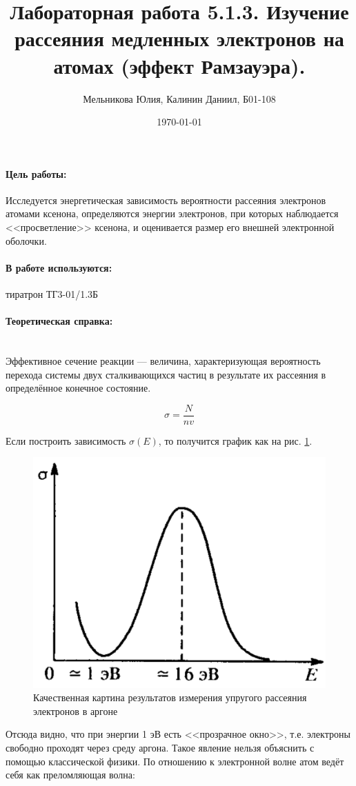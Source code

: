 \documentclass[a4paper, 12pt]{article}
\author{Мельникова Юлия, Калинин Даниил, Б01-108}
\date{\today}
\title{Лабораторная работа 5.1.3. Изучение рассеяния медленных электронов на атомах (эффект Рамзауэра).}
\newcommand{\parag}[1]{\paragraph*{#1:}}
\begin{document}
\maketitle
\parindent=0cm

\parag {Цель работы}
Исследуется энергетическая зависимость вероятности рассеяния электронов атомами ксенона, определяются энергии электронов, при которых наблюдается <<просветление>> ксенона, и оценивается размер его внешней электронной оболочки. 

\parag {В работе используются}
тиратрон ТГ3-01/1.3Б

\parag {Теоретическая справка} ~\\

Эффективное сечение реакции --- величина, характеризующая вероятность перехода системы двух сталкивающихся частиц в результате их рассеяния в определённое конечное состояние.

\begin{equation}
    \sigma = \frac{N}{nv}
\end{equation}

Если построить зависимость $\sigma (E)$, то получится график как на рис. \ref{pic:sigE}.

\begin{figure}[!h]
    \includegraphics[scale = 0.3]{sig_e}
    \centering
    \caption{Качественная картина результатов измерения упругого рассеяния электронов в аргоне}
    \label{pic:sigE}
\end{figure}

Отсюда видно, что при энергии 1 эВ есть <<прозрачное окно>>, т.е. электроны свободно проходят через среду аргона. Такое явление нельзя объяснить с помощью классической физики. По отношению к электронной волне атом ведёт себя как преломляющая волна:
\end{document}
